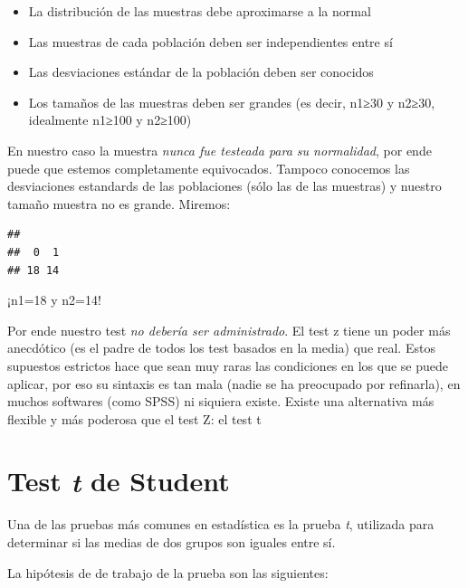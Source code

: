 \documentclass[
]{book}
\newenvironment{Shaded}{\begin{snugshade}}{\end{snugshade}}
\newcommand{\FunctionTok}[1]{\textcolor[rgb]{0.00,0.00,0.00}{#1}}
\newcommand{\NormalTok}[1]{#1}
\newcommand{\SpecialCharTok}[1]{\textcolor[rgb]{0.00,0.00,0.00}{#1}}
\begin{document}
\begin{itemize}
\item
  La distribución de las muestras debe aproximarse a la normal
\item
  Las muestras de cada población deben ser independientes entre sí
\item
  Las desviaciones estándar de la población deben ser conocidos
\item
  Los tamaños de las muestras deben ser grandes (es decir, n1≥30 y n2≥30, idealmente n1≥100 y n2≥100)
\end{itemize}

En nuestro caso la muestra \emph{nunca fue testeada para su normalidad}, por ende puede que estemos completamente equivocados. Tampoco conocemos las desviaciones estandards de las poblaciones (sólo las de las muestras) y nuestro tamaño muestra no es grande. Miremos:

\begin{Shaded}
\end{Shaded}

\begin{verbatim}
## 
##  0  1 
## 18 14
\end{verbatim}

¡n1=18 y n2=14!

Por ende nuestro test \emph{no debería ser administrado}. El test z tiene un poder más anecdótico (es el padre de todos los test basados en la media) que real. Estos supuestos estrictos hace que sean muy raras las condiciones en los que se puede aplicar, por eso su sintaxis es tan mala (nadie se ha preocupado por refinarla), en muchos softwares (como SPSS) ni siquiera existe.
Existe una alternativa más flexible y más poderosa que el test Z: el test t

\hypertarget{test-t-de-student}{%
\section{\texorpdfstring{Test \emph{t} de Student}{Test t de Student}}\label{test-t-de-student}}

Una de las pruebas más comunes en estadística es la prueba \emph{t}, utilizada para determinar si las medias de dos grupos son iguales entre sí.

La hipótesis de de trabajo de la prueba son las siguientes:
\end{document}
